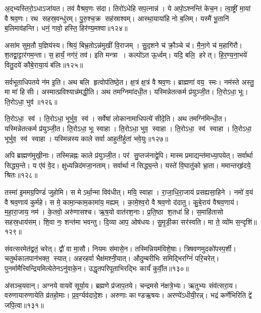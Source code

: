 अ॒द्भ्यस्तिरो॒ऽधाऽजा॑यत। तव॑ वैश्रव॒णः स॑दा। 
तिरो॑ऽधेहि सप॒त्नान्न॑। ये अपो॒ऽश्नन्ति॑ केच॒न। 
त्वा॒ष्ट्रीं मा॒यां वैश्रव॒णः। रथ सहस्र॒वन्धु॑रम्‌। 
पु॒रु॒श्च॒क्र सह॑स्राश्वम्‌। आस्था॒याया॑हि नो ब॒लिम्‌। 
यस्मै॑ भू॒तानि॑ ब॒लिमाव॑हन्ति। धनं॒ गावो॒ हस्ति॒ हिर॑ण्य॒मश्वा\sn{}॥१२४॥


असा॑म सुम॒तौ य॒ज्ञिय॑स्य। श्रियं॒ बिभ्र॒तोऽन्न॑मुखीं वि॒राजम्‌। 
सु॒द॒\ar{}शने च॑ क्रौ॒ञ्चे च॑। मै॒ना॒गे च॑ म॒हागि॑रौ। 
श॒तद्वा॒ट्टार॑गम॒न्ता। स॒हार्यं॒ नग॑रं॒ तव॑। 
इति मन्त्रा। कल्पो॑ऽत ऊ॒र्ध्वम्‌। यदि॒ बलि॒ हरेत्‌। 
हि॒र॒ण्य॒ना॒भये॑ वितु॒दये॑ कौबे॒राया॒यं ब॑लिः॥१२५॥


सर्वभूताधिपतये न॑म इ॒ति। अथ बलि हृत्वोप॑तिष्ठे॒त। 
क्ष॒त्रं क्ष॒त्रं वैश्रव॒णः। ब्राह्मणा॑ वय॒ स्मः। 
नम॑स्ते अस्तु॒ मा मा॑ हिसीः। अस्मात्प्रविश्यान्न॑मद्धी॒ति। 
अथ तमग्निमा॑दधी॒त। यस्मिन्नेतत्कर्म प्र॑युञ्जी॒त। 
ति॒रोऽधा॒ भूः। ति॒रोऽधा॒ भुव॑॥१२६॥


ति॒रोऽधा॒ स्व॑। ति॒रोऽधा॒ भूर्भुव॒ स्व॑। 
सर्वेषां लोकानामाधिपत्ये॑ सीदे॒ति। अथ तमग्नि॑मिन्धी॒त। 
यस्मिन्नेतत्कर्म प्र॑युञ्जी॒त। ति॒रोऽधा॒ भूः स्वाहा। 
ति॒रोऽधा॒ भुव॒ स्वाहा। ति॒रोऽधा॒ स्व॑ स्वाहा। 
ति॒रोऽधा॒ भूर्भुव॒ स्व॑ स्वाहा। 
यस्मिन्नस्य काले सर्वा आहुतीर्\mbox{}हुता॑ भवे॒युः॥१२७॥


अपि ब्राह्मण॑मुखी॒नाः। तस्मिन्नह्नः काले प्र॑युञ्जी॒त। 
पर॑ सु॒प्तज॑नाद्वे॒पि। मास्म प्रमाद्यन्त॑माध्या॒पयेत्‌। 
सर्वार्था सिद्ध्य॒न्ते। य ए॑वं वे॒द। 
क्षुध्यन्निद॑मजा॒नताम्‌। सर्वार्था न॑ सिद्ध्य॒न्ते। 
यस्ते॑ वि॒घातु॑को भ्रा॒ता। ममान्तर्‌हृ॑दये॒ श्रितः॥१२८॥


तस्मा॑ इ॒ममग्र॒पिण्डं॑ जुहोमि। स मेऽर्था॒न्मा विव॑धीत्‌। 
मयि॒ स्वाहा। रा॒जा॒धि॒रा॒जाय॑ प्रसह्यसा॒हिने। 
नमो॑ व॒यं वैश्रव॒णाय॑ कुर्महे। स मे॒ कामा॒न्काम॒कामा॑य॒ मह्यम्‌। 
का॒मे॒श्व॒रो वैश्रव॒णो द॑दातु। कु॒बे॒राय॑ वैश्रव॒णाय॑। 
म॒हा॒रा॒जाय॒ नम॑। के॒तवो॒ अरु॑णासश्च। 
ऋ॒ष॒यो वात॑रश॒नाः। प्र॒ति॒ष्ठा श॒तधा॑ हि। 
स॒माहि॑तासो सहस्र॒धाय॑सम्‌। शि॒वा नः॒ शन्त॑मा भवन्तु। 
दि॒व्या आप॒ ओष॑धयः। सु॒मृ॒डी॒का सर॑स्वति। 
मा ते॒ व्यो॑म स॒न्दृशि॑॥१२९॥\anuvakamend


संवत्सरमेत॑द्व्रतं॒ चरेत्‌। द्वौ॑ वा मा॒सौ। 
नियमः स॑मासे॒न। तस्मिन्नियम॑विशे॒षाः। 
त्रिषवणमुदको॑पस्प॒र्शी। चतुर्थकालपान॑भक्त॒ स्यात्‌। 
अहरहर्वा भैक्ष॑मश्नी॒यात्‌। औदुम्बरीभिः समिद्भिरग्निं॑ परि॒चरेत्‌। 
पुनर्मामैत्त्विन्द्रियमित्येतेनऽनु॑वाके॒न। उद्धृतपरिपूताभि\-रद्भिः कार्यं॑ कुर्वी॒त॥१३०॥


अ॑सञ्च॒यवान्‌। अग्नये वायवे॑ सूर्या॒य। 
ब्रह्मणे प्र॑जाप॒तये। चन्द्रमसे न॑क्षत्रे॒भ्यः। 
ऋतुभ्यः संव॑त्सरा॒य। वरुणायारुणायेति व्र॑तहो॒माः। 
प्र॒व॒र्ग्यव॑दादे॒शः। अरुणाः काण्डऋ॒षयः। 
अरण्ये॑ऽधीयी॒रन्न्‌। भद्रं कर्णेभिरिति द्वे॑ जपि॒त्वा॥१३१॥



